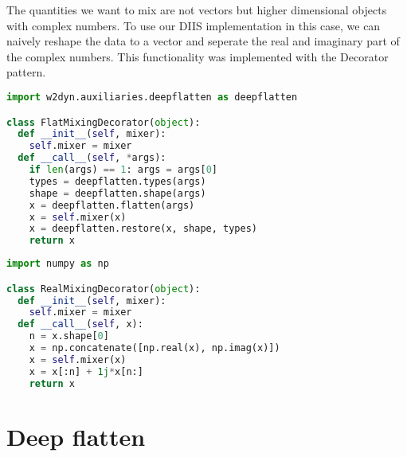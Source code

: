 The quantities we want to mix are not vectors but higher dimensional objects with complex numbers. To use our DIIS implementation in this case, we can naively reshape the data to a vector and seperate the real and imaginary part of the complex numbers. This functionality was implemented with the Decorator pattern.

\begin{lstlisting}[label=lst:flatdec, language=python, caption=Flat mixing decorator]
import w2dyn.auxiliaries.deepflatten as deepflatten

class FlatMixingDecorator(object):
  def __init__(self, mixer):
    self.mixer = mixer
  def __call__(self, *args):
    if len(args) == 1: args = args[0]
    types = deepflatten.types(args)
    shape = deepflatten.shape(args)
    x = deepflatten.flatten(args)
    x = self.mixer(x)
    x = deepflatten.restore(x, shape, types)
    return x
\end{lstlisting}

\begin{lstlisting}[label=lst:realdec, language=python, caption=Real mixing decorator]
import numpy as np

class RealMixingDecorator(object):
  def __init__(self, mixer):
    self.mixer = mixer
  def __call__(self, x):
    n = x.shape[0]
    x = np.concatenate([np.real(x), np.imag(x)])
    x = self.mixer(x)
    x = x[:n] + 1j*x[n:]
    return x
\end{lstlisting}

\section{Deep flatten}

